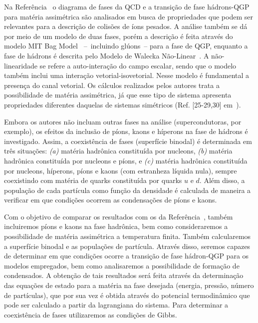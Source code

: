 Na Referência~\cite{Rafael} o diagrama de fases da QCD e a transição de fase hádrons-QGP para matéria assimétrica são analisados em busca de propriedades que podem ser relevantes para a descrição de colisões de íons pesados. A análise também se dá por meio de um modelo de duas fases, porém a descrição é feita através do modelo MIT Bag Model~\cite{Buballa} --~incluindo glúons~-- para a fase de QGP, enquanto a fase de hádrons é descrita pelo Modelo de Walecka Não-Linear~\cite{Advances16}. A não-linearidade se refere a auto-interação do campo escalar, sendo que o modelo também inclui uma interação vetorial-isovetorial. Nesse modelo é fundamental a presença do canal vetorial. Os cálculos realizados pelos autores trata a possibilidade de matéria assimétrica, já que esse tipo de sistema apresenta propriedades diferentes daquelas de sistemas simétricos (Ref. [25-29,30] em~\cite{Rafael}).

Embora os autores não incluam outras fases na análise (supercondutoras, por exemplo), os efeitos da inclusão de píons, kaons e híperons na fase de hádrons é investigado. Assim, a coexistência de fases (superfície binodal) é determinada em três situações: \emph{(a)} matéria hadrônica constituída por nucleons, \emph{(b)} matéria hadrônica constituída por nucleons e píons, e \emph{(c)} matéria hadrônica constituída por nucleons, híperons, píons e kaons (com estranheza líquida nula), sempre coexistindo com matéria de quarks constituída por quarks $u$ e $d$. Além disso, a população de cada partícula como função da densidade é calculada de maneira a verificar em que condições ocorrem as condensações de píons e kaons.

Com o objetivo de comparar os resultados com os da Referência~\cite{Rafael}, também incluiremos píons e kaons na fase hadrônica, bem como consideraremos a possibilidade de matéria assimétrica a temperatura finita. Também calcularemos a superfície binodal e as populações de partícula. Através disso, seremos capazes de determinar em que condições ocorre a transição de fase hádron-QGP para os modelos empregados, bem como analisaremos a possibilidade de formação de condensados. A obtenção de tais resultados será feita através da determinação das equações de estado para a matéria na fase desejada (energia, pressão, número de partículas), que por sua vez é obtida através do potencial termodinâmico que pode ser calculado a partir da lagrangiana do sistema. Para determinar a coexistência de fases utilizaremos as condições de Gibbs.

\vspace{1cm}


